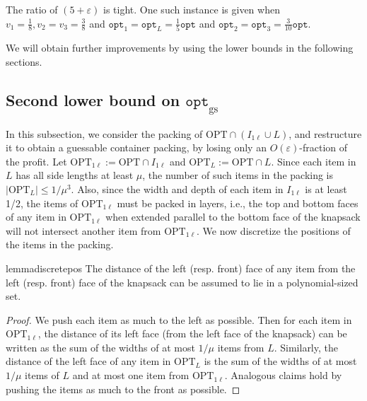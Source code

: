 \documentclass[10pt,a4paper]{amsart}
\newcommand{\mt}[1]{#1}
\newcommand{\eps}{\varepsilon}
\renewcommand{\epsilon}{\varepsilon} %
\theoremstyle{definition}
\newcommand{\hmax}{\mu}
\newcommand{\opt}{\mathtt{opt}}
\newcommand{\optgs}{\mathtt{opt}_{\mathrm{gs}}}
\newcommand{\OPT}{\mathrm{OPT}}
\newcommand{\OPTonel}{\text{OPT}_{1\ell}}
\newcommand{\OPTL}{\text{OPT}_L}
\begin{document}

\mt{The ratio of $(5+\eps)$ is tight. One such instance is given when $v_1 =\frac{1}{8}, v_2=v_3=\frac{3}{8} $ and $\opt_1=\opt_L=\frac{1}{5}\opt$ and $\opt_2=\opt_3=\frac{3}{10}\opt.$ }

We will obtain further improvements by using the lower bounds in the following sections.
\subsection{Second lower bound on \texorpdfstring{$\optgs$}{optgs}}
\label{sec:secondlb}
In this subsection, we consider the packing of $\OPT\cap (I_{1\ell}\cup L)$, and restructure it to obtain a guessable container packing, by losing only an $O(\epsilon)$-fraction of the profit. 
Let $\OPTonel := \OPT\cap I_{1\ell}$ and $\OPTL := \OPT\cap L$. Since each item in $L$ has all side lengths at least $\hmax$, the number of such items in the packing is $|\OPTL| \le 1/\hmax^3$. 
Also, since the width and depth
of each item in $I_{1\ell}$ is at least 1/2, the items of $\OPTonel$ must be packed in layers, i.e., the top and bottom faces of any item in $\OPTonel$ when extended parallel to the bottom face of the knapsack will not intersect another item from $\OPTonel$. We now discretize the positions of the items in the packing.

\begin{restatable}{lemma}{discretepos}
\label{lem:discretepos}
    The distance of the left (resp. front) face of any item from the left (resp. front) face of the knapsack can be assumed to lie in a polynomial-sized set.
\end{restatable}
\begin{proof}
We push each item as much to the left as possible. Then for each item in $\OPTonel$, the distance of its left face (from the left face of the knapsack) can be written as the sum of the widths of at most $1/\hmax$ items from $L$. Similarly, the distance of the left face of any item in $\OPTL$ is the sum of the widths of at most $1/\hmax$ items of $L$ and at most one item from $\OPTonel$. Analogous claims hold by pushing the items as much to the front as possible.
\end{proof}
\end{document}
